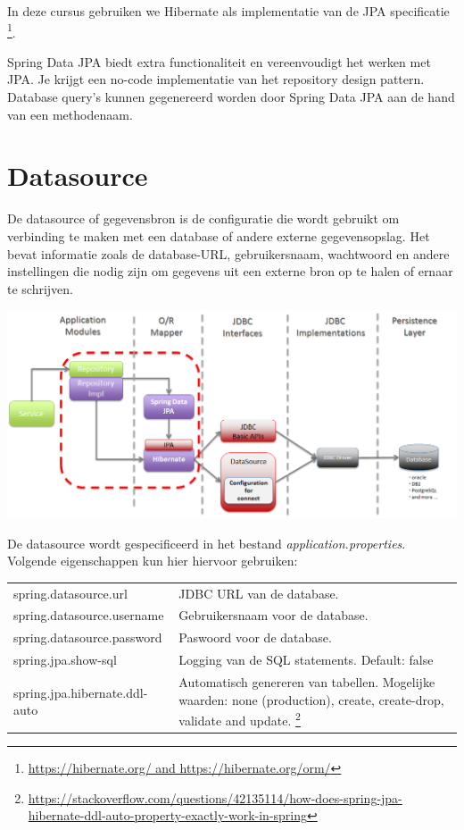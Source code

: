 In deze cursus gebruiken we Hibernate als implementatie van de JPA specificatie \footnote{\url{https://hibernate.org/ and https://hibernate.org/orm/}}.  

Spring Data JPA biedt extra functionaliteit en vereenvoudigt het werken met JPA. 
Je krijgt een no-code implementatie van het repository design pattern. Database query's kunnen gegenereerd worden  door Spring Data JPA aan de hand van een methodenaam.


\section{Datasource}

De datasource of gegevensbron is de configuratie die wordt gebruikt om verbinding te maken met een database of andere externe gegevensopslag. Het bevat informatie  zoals de database-URL, gebruikersnaam, wachtwoord en andere instellingen die nodig zijn om gegevens uit een externe bron op te halen of ernaar te schrijven.

\includegraphics[width=\textwidth]{./images/chapter-jpa/springdatajpa}

De datasource wordt gespecificeerd in het bestand \textit{application.properties}.
Volgende eigenschappen kun hier hiervoor gebruiken:

\begin{tabular}{|l|p{8cm}|}
\hline
spring.datasource.url & JDBC URL van de database.\\
spring.datasource.username & Gebruikersnaam voor de database.\\
spring.datasource.password & Paswoord voor de database.\\
spring.jpa.show-sql & Logging van de SQL statements. Default: false\\
spring.jpa.hibernate.ddl-auto & Automatisch genereren van tabellen. Mogelijke waarden: none (production), create, create-drop, validate and update. \footnote{\url{https://stackoverflow.com/questions/42135114/how-does-spring-jpa-hibernate-ddl-auto-property-exactly-work-in-spring}}\\
\hline
\end{tabular}

